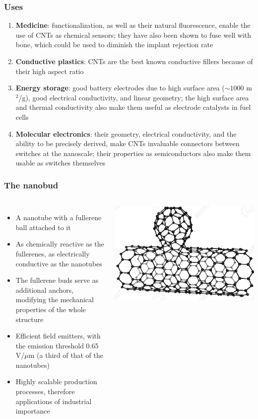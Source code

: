 \documentclass{beamer}
\begin{document}
\begin{frame}
	\frametitle{Uses}
	\begin{enumerate}
	\item \textbf{Medicine}: functionalization, as well as their natural fluorescence, enable the use of CNTs as chemical sensors; they have also been shown to fuse well with bone, which could be used to diminish the implant rejection rate
	\item \textbf{Conductive plastics}: CNTs are the best known conductive fillers because of their high aspect ratio
	\item \textbf{Energy storage}: good battery electrodes due to high surface area ($\sim 1000$ m$^2$/g), good electrical conductivity, and linear geometry; the high surface area and thermal conductivity also make them useful as electrode catalysts in fuel cells
	\item \textbf{Molecular electronics}: their geometry, electrical conductivity, and the ability to be precisely derived, make CNTs invaluable connectors between switches at the nanoscale; their properties as semiconductors also make them usable as switches themselves
	\end{enumerate}
\end{frame}

\begin{frame}
	\frametitle{The nanobud}
	\begin{columns}
		\begin{itemize}
			\item A nanotube with a fullerene ball attached to it
			\item As chemically reactive as the fullerenes, as electrically conductive as the nanotubes
			\item The fullerene buds serve as additional anchors, modifying the mechanical properties of the whole structure
			\item Efficient field emitters, with the emission threshold 0.65 V/$\mu$m (a third of that of the nanotubes)
			\item Highly scalable production processes, therefore applications of industrial importance
		\end{itemize}
			\includegraphics[scale=.15]{Nanobud}
	\end{columns}
\end{frame}
\end{document}
